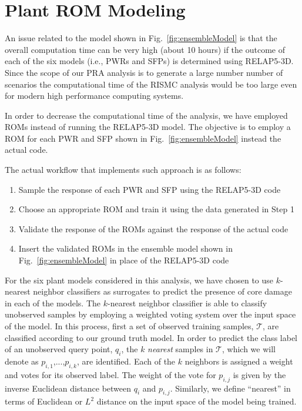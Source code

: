 \section{Plant ROM Modeling}
\label{sec:plantRomModeling}
An issue related to the model shown in Fig.~\ref{fig:ensembleModel} is that the overall 
computation time can be very high (about 10 hours) if the outcome of each of the six 
models (i.e., PWRs and SFPs) is determined using RELAP5-3D.
Since the scope of our PRA analysis is to generate a large number number of scenarios
the computational time of the RISMC analysis would be too large even for modern high 
performance computing systems.

In order to decrease the computational time of the analysis, we have employed ROMs instead of running 
the RELAP5-3D model. The objective is to employ a ROM for each PWR and SFP shown in 
Fig.~\ref{fig:ensembleModel} instead the actual code.

The actual workflow that implements such approach is as follows:
\begin{enumerate}
  \item Sample the response of each PWR and SFP using the RELAP5-3D code
  \item Choose an appropriate ROM and train it using the data generated in Step 1
  \item Validate the response of the ROMs against the response of the actual code
  \item Insert the validated ROMs in the ensemble model shown in Fig.~\ref{fig:ensembleModel} in place of the RELAP5-3D 
        code 
\end{enumerate}

\newcommand{\DPM}[1]{\textcolor{magenta}{#1}}

For the six plant models considered in this analysis, we have chosen to use $k$-nearest neighbor classifiers as surrogates to predict the presence of core damage in each of the models.
%
The $k$-nearest neighbor classifier is able to classify unobserved samples by employing a weighted voting system over the input space of the model.
%
In this process, first a set of observed training samples, $\mathcal{T}$, are classified according to our ground truth model.
%
In order to predict the class label of an unobserved query point, $q_i$, the $k$ \emph{nearest} samples in $\mathcal{T}$, which we will denote as $p_{i,1}$,...,$p_{i,k}$, are identified.
%
Each of the $k$ neighbors is assigned a weight and votes for its observed label.
%
The weight of the vote for $p_{i,j}$ is given by the inverse Euclidean distance between $q_i$ and $p_{i,j}$.
%
Similarly, we define ``nearest'' in terms of Euclidean or $L^2$ distance on the input space of the model being trained.

